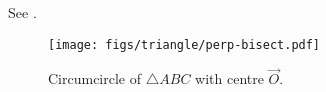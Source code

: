 \solution 
See 
.
\begin{figure}
\centering
\texttt{[image: figs/triangle/perp-bisect.pdf]}
	\caption{Circumcircle of $\triangle ABC$ with centre $\vec{O}$.}
\label{fig:circumcircle with centre O}	
\end{figure}

